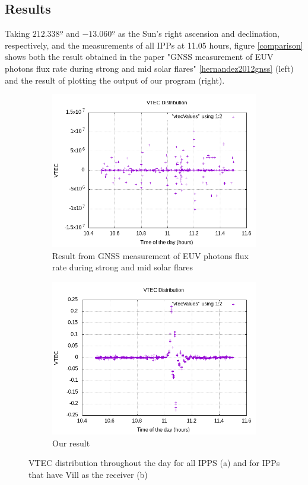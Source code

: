 \begin{unitVectorObjectB}
\section{Results}

Taking $212.338º$ and $-13.060º$ as the Sun's right ascension and declination, respectively, and the measurements of all IPPs at 11.05 hours, figure \ref{comparison} shows both the result obtained in the paper "GNSS measurement of EUV photons flux rate during strong and mid solar flares" \ref{hernandez2012gnss} (left) and the result of plotting the output of our program (right).

\begin{figure}[!htb]
	\begin{subfigure}[b]{0.5\textwidth}
		\includegraphics[width=\linewidth]{images/ch4/vtecDistributionGeneral.png}
		\caption{Result from GNSS measurement of EUV photons flux rate during strong and mid solar flares}
	\end{subfigure}
	\hfill
	\begin{subfigure}[b]{0.5\textwidth}
		\includegraphics[width=\linewidth]{images/ch4/vtecDistributionVill.png}
		\caption{Our result}
	\end{subfigure}
	\caption{VTEC distribution throughout the day for all IPPS (a) and for IPPs that have Vill as the receiver (b)}
	\label{fig:comparison}
\end{figure}


\end{unitVectorObjectB}
